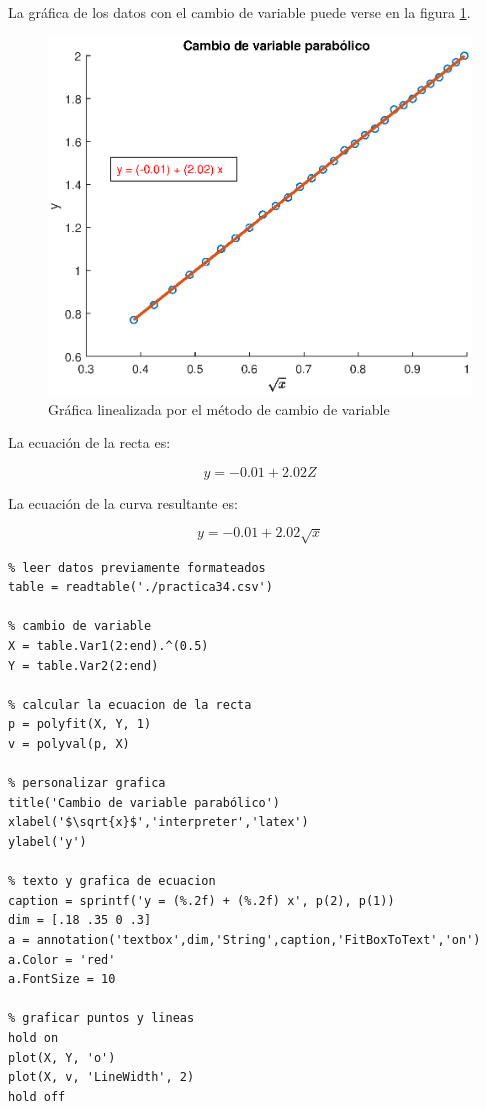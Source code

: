 \documentclass[letter,11pt]{article}
\begin{document}
La gráfica de los datos con el cambio de variable puede verse en la figura
\ref{practica34_3}.

\begin{figure}[!h]
\centering
\includegraphics[scale=1.00]{eps/3.4.3.eps}
\caption{Gráfica linealizada por el método de cambio de variable}
\label{practica34_3}
\end{figure}

La ecuación de la recta es:

\begin{equation}
    y = -0.01 + 2.02 Z
\end{equation}

La ecuación de la curva resultante es:

\begin{equation}
    y = -0.01 + 2.02 \sqrt{x}
\end{equation}

\footnotesize
\begin{verbatim}
% leer datos previamente formateados
table = readtable('./practica34.csv')

% cambio de variable
X = table.Var1(2:end).^(0.5)
Y = table.Var2(2:end)

% calcular la ecuacion de la recta
p = polyfit(X, Y, 1)
v = polyval(p, X)

% personalizar grafica
title('Cambio de variable parabólico')
xlabel('$\sqrt{x}$','interpreter','latex')
ylabel('y')

% texto y grafica de ecuacion
caption = sprintf('y = (%.2f) + (%.2f) x', p(2), p(1))
dim = [.18 .35 0 .3]
a = annotation('textbox',dim,'String',caption,'FitBoxToText','on')
a.Color = 'red'
a.FontSize = 10

% graficar puntos y lineas
hold on
plot(X, Y, 'o')
plot(X, v, 'LineWidth', 2)
hold off
\end{verbatim}
\normalsize
\end{document}
